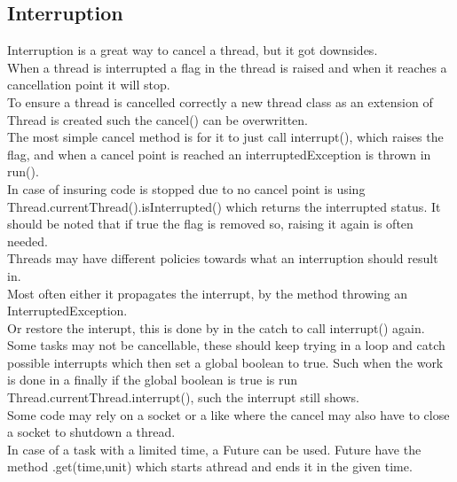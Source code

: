 \documentclass[12pt, a4paper]{article}
\begin{document}
		\subsection{Interruption}
			Interruption is a great way to cancel a thread, but it got downsides.\\
			When a thread is interrupted a flag in the thread is raised and when it reaches a cancellation point it will stop.\\
			To ensure a thread is cancelled correctly a new thread class as an extension of Thread is created such the cancel() can be overwritten.\\
			The most simple cancel method is for it to just call interrupt(), which raises the flag, and when a cancel point is reached an interruptedException is thrown in run().\\
			In case of insuring code is stopped due to no cancel point is using Thread.currentThread().isInterrupted() which returns the interrupted status. It should be noted that if true the flag is removed so, raising it again is often needed.\\[4mm]
			Threads may have different policies towards what an interruption should result in.\\
			Most often either it propagates the interrupt, by the method throwing an InterruptedException.\\
			Or restore the interupt, this is done by in the catch to call interrupt() again.\\[4mm]
			Some tasks may not be cancellable, these should keep trying in a loop and catch possible interrupts which then set a global boolean to true. Such when the work is done in a finally if the global boolean is true is run Thread.currentThread.interrupt(), such the interrupt still shows.\\[4mm]
			Some code may rely on a socket or a like where the cancel may also have to close a socket to shutdown a thread.\\
			In case of a task with a limited time, a Future can be used. Future have the method .get(time,unit) which starts athread and ends it in the given time.\\
\end{document}

